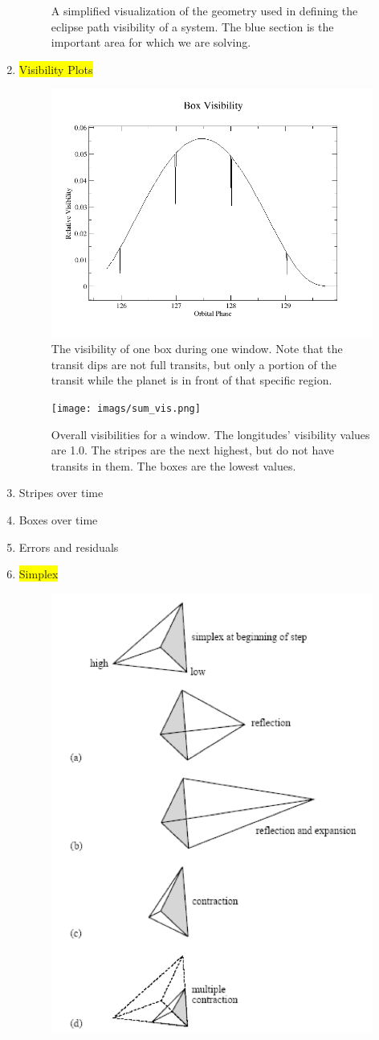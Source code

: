 \documentclass[iop]{emulateapj}
\newcommand{\hilight}[1]{\colorbox{yellow}{#1}}
\begin{document}
\begin{enumerate}
\begin{figure}[h]
				\caption{A simplified visualization of the geometry used in defining the eclipse path visibility of a system. The blue section is the important area for which we are solving.}
				\label{eclipse}
			\end{figure}
		\item \hilight{Visibility Plots}
			\begin{figure}[h]
				\centering
				\includegraphics[width=.5\textwidth]{images/box_vis.png}
				\caption{The visibility of one box during one window. Note that the transit dips are not full transits, but only a portion of the transit while the planet is in front of that specific region.}
				\label{box}
			\end{figure}
			\begin{figure}[h]
				\centering
				\texttt{[image: imags/sum\_vis.png]}
				\caption{Overall visibilities for a window. The longitudes' visibility values are 1.0. The stripes are the next highest, but do not have transits in them. The boxes are the lowest values.} 
				\label{sum_vis}
			\end{figure}
		\item Stripes over time
		\item Boxes over time
		\item Errors and residuals
		\item  \hilight{Simplex}
			\begin{figure}[h]
				\centering
				\includegraphics[width=.5\textwidth]{images/simplex.png}

\end{figure}
\end{enumerate}
\end{document}
